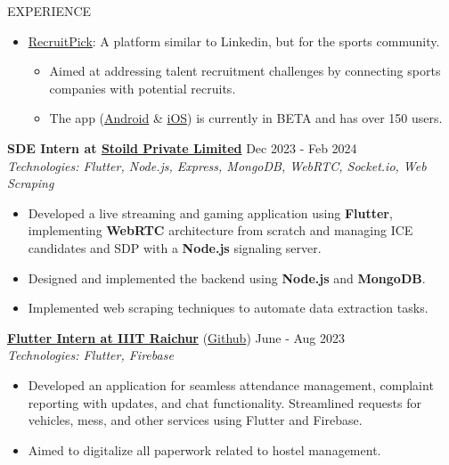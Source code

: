 \documentclass{resume}
\begin{document}
\begin{rSection}{EXPERIENCE}
\begin{itemize}
        \item \href{https://recruitpick.com}{RecruitPick}: A platform similar to Linkedin, but for the sports community.
              \begin{itemize}
                  \itemsep -3pt {}
                  \item Aimed at addressing talent recruitment challenges by connecting sports companies with potential recruits.
                  \item The app (\href{https://play.google.com/store/apps/details?id=com.recruitpick.app.prod}{Android} \& \href{https://apps.apple.com/in/app/recruit-pick-inc/id6478814537}{iOS}) is currently in BETA and has over 150 users.
              \end{itemize}
    \end{itemize}

    \textbf{SDE Intern at \href{https://stoild.in/}{Stoild Private Limited}} \hfill Dec 2023 - Feb 2024\\
    \textit{Technologies: Flutter, Node.js, Express, MongoDB, WebRTC, Socket.io, Web Scraping}
    \begin{itemize}
        \itemsep -3pt {}
        \item Developed a live streaming and gaming application using \textbf{Flutter}, implementing \textbf{WebRTC} architecture from scratch and managing ICE candidates and SDP with a \textbf{Node.js} signaling server.
        \item Designed and implemented the backend using \textbf{Node.js} and \textbf{MongoDB}.
        \item Implemented web scraping techniques to automate data extraction tasks.
    \end{itemize}

    \textbf{\href{https://drive.google.com/file/d/16NqRxg5LFhZu0WkdqG3z83XnLyf5P2UO/view?usp=sharing}{Flutter Intern at IIIT Raichur}} (\href{https://github.com/ShivanshuKGupta/hustle_stay}{Github}) \hfill June - Aug 2023\\
    \textit{Technologies: Flutter, Firebase}
    \begin{itemize}
        \itemsep -3pt {}
        \item Developed an application for seamless attendance management, complaint reporting with updates, and chat functionality. Streamlined requests for vehicles, mess, and other services using Flutter and Firebase.
        \item Aimed to digitalize all paperwork related to hostel management.
    \end{itemize}

\end{rSection}
\end{document}
